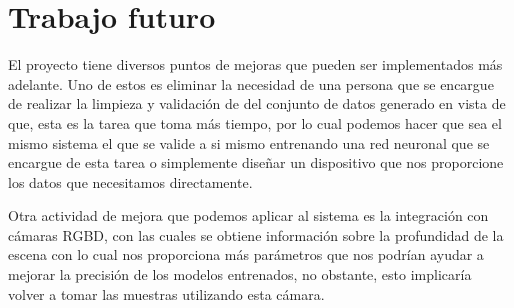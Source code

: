\section{Trabajo futuro}

El proyecto tiene diversos puntos de mejoras que pueden ser implementados más adelante. Uno de estos es eliminar la necesidad de una persona que se encargue de realizar la limpieza y validación de del conjunto de datos generado en vista de que, esta es la tarea que toma más tiempo, por lo cual podemos hacer que sea el mismo sistema el que se valide a si mismo entrenando una red neuronal que se encargue de esta tarea o simplemente diseñar un dispositivo que nos proporcione los datos que necesitamos directamente.

Otra actividad de mejora que podemos aplicar al sistema es la integración con cámaras RGBD, con las cuales se obtiene información sobre la profundidad de la escena con lo cual nos proporciona más parámetros que nos podrían ayudar a mejorar la precisión de los modelos entrenados, no obstante, esto implicaría volver a tomar las muestras utilizando esta cámara.

